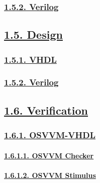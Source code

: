 \documentclass[
]{article}
\begin{document}
\hypertarget{verilog-1}{%
\subsubsection{\texorpdfstring{\protect\hyperlink{verilog-5}{1.5.2.
Verilog}}{1.5.2. Verilog}}\label{verilog-1}}

\hypertarget{design}{%
\subsection{\texorpdfstring{\protect\hyperlink{design-1}{1.5.
Design}}{1.5. Design}}\label{design}}

\hypertarget{vhdl-2}{%
\subsubsection{\texorpdfstring{\protect\hyperlink{vhdl-5}{1.5.1.
VHDL}}{1.5.1. VHDL}}\label{vhdl-2}}

\hypertarget{verilog-2}{%
\subsubsection{\texorpdfstring{\protect\hyperlink{verilog-5}{1.5.2.
Verilog}}{1.5.2. Verilog}}\label{verilog-2}}

\hypertarget{verification}{%
\subsection{\texorpdfstring{\protect\hyperlink{verification-1}{1.6.
Verification}}{1.6. Verification}}\label{verification}}

\hypertarget{osvvm-vhdl}{%
\subsubsection{\texorpdfstring{\protect\hyperlink{osvvm-vhdl-1}{1.6.1.
OSVVM-VHDL}}{1.6.1. OSVVM-VHDL}}\label{osvvm-vhdl}}

\hypertarget{osvvm-checker}{%
\paragraph{\texorpdfstring{\protect\hyperlink{osvvm-checker-1}{1.6.1.1.
OSVVM Checker}}{1.6.1.1. OSVVM Checker}}\label{osvvm-checker}}

\hypertarget{osvvm-stimulus}{%
\paragraph{\texorpdfstring{\protect\hyperlink{osvvm-stimulus-1}{1.6.1.2.
OSVVM Stimulus}}{1.6.1.2. OSVVM Stimulus}}\label{osvvm-stimulus}}
\end{document}
